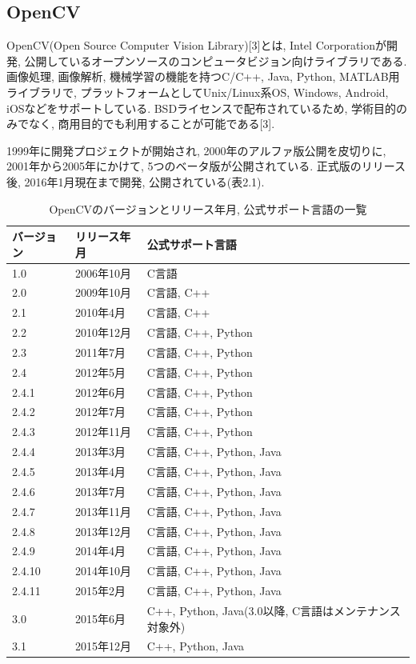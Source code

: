 \subsection{OpenCV}
OpenCV(Open Source Computer Vision Library)[3]とは, Intel Corporationが開発, 公開しているオープンソースのコンピュータビジョン向けライブラリである.
画像処理, 画像解析, 機械学習の機能を持つC/C++, Java, Python, MATLAB用ライブラリで, プラットフォームとしてUnix/Linux系OS, Windows, Android, iOSなどをサポートしている.
BSDライセンスで配布されているため, 学術目的のみでなく, 商用目的でも利用することが可能である[3].

1999年に開発プロジェクトが開始され, 2000年のアルファ版公開を皮切りに, 2001年から2005年にかけて, 5つのベータ版が公開されている.
正式版のリリース後, 2016年1月現在まで開発, 公開されている(表2.1).

\begin{table}[tb]
\begin{center}
\begin{tabular}{|l|l|l|} \hline
バージョン & リリース年月 & 公式サポート言語 \\ \hline \hline
1.0 & 2006年10月 & C言語 \\ \hline
2.0 & 2009年10月 & C言語, C++ \\ \hline
2.1 & 2010年4月 & C言語, C++ \\ \hline
2.2 & 2010年12月 & C言語, C++, Python \\ \hline
2.3 & 2011年7月 & C言語, C++, Python \\ \hline
2.4 & 2012年5月 & C言語, C++, Python \\ \hline
2.4.1 & 2012年6月 & C言語, C++, Python \\ \hline
2.4.2 & 2012年7月 & C言語, C++, Python \\ \hline
2.4.3 & 2012年11月 & C言語, C++, Python \\ \hline
2.4.4 & 2013年3月 & C言語, C++, Python, Java \\ \hline
2.4.5 & 2013年4月 & C言語, C++, Python, Java \\ \hline
2.4.6 & 2013年7月 & C言語, C++, Python, Java \\ \hline
2.4.7 & 2013年11月 & C言語, C++, Python, Java \\ \hline
2.4.8 & 2013年12月 & C言語, C++, Python, Java \\ \hline
2.4.9 & 2014年4月 & C言語, C++, Python, Java \\ \hline
2.4.10 & 2014年10月 & C言語, C++, Python, Java \\ \hline
2.4.11 & 2015年2月 & C言語, C++, Python, Java \\ \hline
3.0 & 2015年6月 & C++, Python, Java(3.0以降, C言語はメンテナンス対象外) \\ \hline
3.1 & 2015年12月 & C++, Python, Java \\ \hline
\end{tabular}
\caption{OpenCVのバージョンとリリース年月, 公式サポート言語の一覧}
\end{center}
\end{table}

